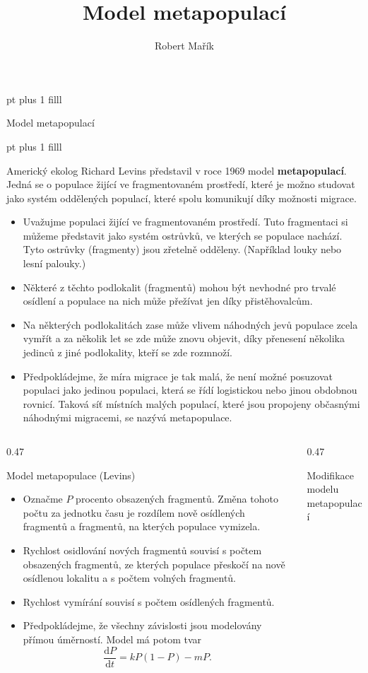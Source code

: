 \documentclass[handouts]{beamer}
\title{Model metapopulací}
\author{Robert Mařík}
\begin{document}
\begin{frame}

   pt plus 1 filll
  
  \begin{center}
    \large Model metapopulací
  \end{center}

   pt plus 1 filll

  Americký ekolog Richard Levins představil v roce 1969 model \textbf{metapopulací}. Jedná se o populace žijící ve fragmentovaném prostředí, které je možno studovat jako systém oddělených populací, které spolu komunikují díky možnosti migrace.

    \begin{itemize}
    \item Uvažujme populaci žijící ve fragmentovaném prostředí. Tuto
      fragmentaci si můžeme představit jako systém ostrůvků, ve
      kterých se populace nachází. Tyto ostrůvky (fragmenty) jsou
      zřetelně odděleny. (Například louky nebo lesní palouky.)
    \item 
Některé z těchto podlokalit (fragmentů) mohou být nevhodné pro trvalé osídlení a populace na nich může přežívat jen díky přistěhovalcům.
\item 
Na některých podlokalitách zase může vlivem náhodných jevů populace zcela vymřít a za několik let se zde může znovu objevit, díky přenesení několika jedinců z jiné podlokality, kteří se zde rozmnoží.
\item 
Předpokládejme, že míra migrace je tak malá, že není možné posuzovat populaci jako jedinou populaci, která se řídí logistickou nebo jinou obdobnou rovnicí. Taková síť místních malých populací, které jsou propojeny občasnými náhodnými migracemi, se nazývá metapopulace.
\end{itemize}

  
\begin{columns}
  \begin{column}{0.47\hsize}
\begin{block}{Model metapopulace (Levins)}
  \begin{itemize}
  \item Označme $P$ procento obsazených fragmentů. Změna tohoto počtu
    za jednotku času je rozdílem nově osídlených fragmentů a
    fragmentů, na kterých populace vymizela. 
  \item Rychlost osidlování
    nových fragmentů souvisí s počtem obsazených fragmentů, ze kterých
    populace přeskočí na nově osídlenou lokalitu a s počtem volných
    fragmentů.
  \item Rychlost vymírání souvisí s počtem osídlených fragmentů.
  \item Předpokládejme, že všechny závislosti jsou modelovány přímou úměrností. Model má potom tvar $$\frac{\mathrm dP}{\mathrm dt}=k P (1-P) - mP.$$
\end{itemize}
\end{block}
\end{column}
\begin{column}{0.47\hsize}
\begin{block}{Modifikace modelu metapopulací}


\end{block}
\end{column}
\end{columns}
\end{frame}
\end{document}
